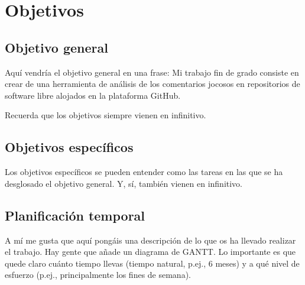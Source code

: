 
\cleardoublepage %
\chapter{Objetivos} %
\label{chap:objetivos} %

\section{Objetivo general} %
\label{sec:objetivo-general} %

Aquí vendría el objetivo general en una frase:
Mi trabajo fin de grado consiste en crear de una herramienta de análisis de los comentarios jocosos en repositorios de software libre alojados en la plataforma GitHub.

Recuerda que los objetivos siempre vienen en infinitivo.


\section{Objetivos específicos}
\label{sec:objetivos-especificos}

Los objetivos específicos se pueden entender como las tareas en las que se ha desglosado el objetivo general.
Y, sí, también vienen en infinitivo.


\section{Planificación temporal} %
\label{sec:planificacion-temporal}

A mí me gusta que aquí pongáis una descripción de lo que os ha llevado realizar el trabajo.
Hay gente que añade un diagrama de GANTT.
Lo importante es que quede claro cuánto tiempo llevas (tiempo natural, p.ej., 6 meses) y a qué nivel de esfuerzo (p.ej., principalmente los fines de semana).


